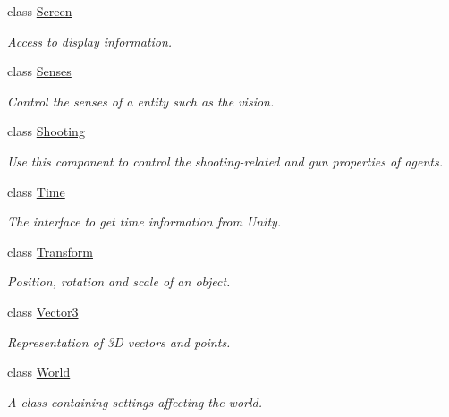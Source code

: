 \begin{DoxyCompactItemize}
class \mbox{\hyperlink{class_lua_1_1_screen}{Screen}}
\begin{DoxyCompactList}\small\item\em Access to display information. \end{DoxyCompactList}\item 
class \mbox{\hyperlink{class_lua_1_1_senses}{Senses}}
\begin{DoxyCompactList}\small\item\em Control the senses of a entity such as the vision. \end{DoxyCompactList}\item 
class \mbox{\hyperlink{class_lua_1_1_shooting}{Shooting}}
\begin{DoxyCompactList}\small\item\em Use this component to control the shooting-\/related and gun properties of agents. \end{DoxyCompactList}\item 
class \mbox{\hyperlink{class_lua_1_1_time}{Time}}
\begin{DoxyCompactList}\small\item\em The interface to get time information from Unity. \end{DoxyCompactList}\item 
class \mbox{\hyperlink{class_lua_1_1_transform}{Transform}}
\begin{DoxyCompactList}\small\item\em Position, rotation and scale of an object. \end{DoxyCompactList}\item 
class \mbox{\hyperlink{class_lua_1_1_vector3}{Vector3}}
\begin{DoxyCompactList}\small\item\em Representation of 3D vectors and points. \end{DoxyCompactList}\item 
class \mbox{\hyperlink{class_lua_1_1_world}{World}}
\begin{DoxyCompactList}\small\item\em A class containing settings affecting the world. \end{DoxyCompactList}\end{DoxyCompactItemize}
